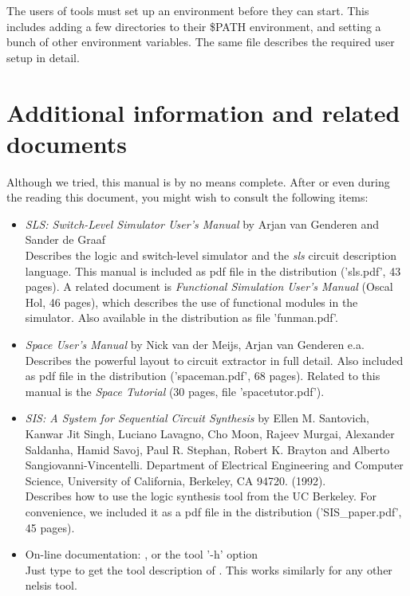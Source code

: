 The users of  tools must set up an environment before they can
start. This includes adding a few directories to their \$PATH environment, and
setting a bunch of other environment variables. The same 
file describes the required user setup in detail.

\newpage
\section{Additional information and related documents}
Although we tried, this manual is by no means complete. After or even during
the reading this document, you might wish to consult the following items:
\begin{itemize}
\item
{\em SLS: Switch-Level Simulator User's Manual} by Arjan van Genderen and
Sander de Graaf\\
Describes the logic and switch-level simulator  and the {\sl sls}
circuit description language. This manual is included as pdf file in the
distribution ('sls.pdf', 43 pages).
A related document is {\sl Functional Simulation User's Manual} (Oscal Hol, 46 pages),
which describes the use of functional modules in the  simulator. Also
available in the distribution as file 'funman.pdf'.
\item
{\em Space User's Manual} by Nick van der Meijs, Arjan van Genderen e.a.\\
Describes the powerful layout to circuit extractor  in full detail.
Also included as pdf file in the distribution ('spaceman.pdf', 68 pages).
Related to this manual is the {\sl Space Tutorial} (30 pages, file 'spacetutor.pdf').
\item {\em SIS: A System for Sequential Circuit Synthesis} 
by Ellen M. Santovich, Kanwar Jit Singh, Luciano Lavagno, Cho Moon, Rajeev
Murgai, Alexander Saldanha, Hamid Savoj, Paul R. Stephan, Robert K. Brayton and
Alberto Sangiovanni-Vincentelli.  Department of Electrical Engineering and
Computer Science, University of California, Berkeley, CA 94720. (1992).\\
Describes how to use the  logic synthesis tool from the UC Berkeley.
For convenience, we included it as a pdf file in the distribution ('SIS\_paper.pdf', 45 pages).
\item
On-line documentation: , 
or the tool '-h' option\\
Just type  to get the tool
description of . This works similarly for any other nelsis tool.

\end{itemize}
